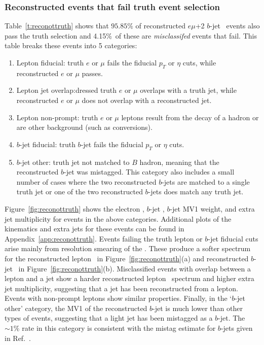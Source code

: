 \subsubsection{Reconstructed events that fail truth event selection}
Table~\ref{t:reconottruth} shows that $95.85\%$ of reconstructed $e\mu$+2 $b$-jet \ttbar\ events also pass the truth selection
and 4.15\%\ of these are \textit{misclassifed} events that fail. 
This table breaks these events into 5 categories:
\begin{enumerate}
\item{Lepton fiducial:} truth $e$ or $\mu$ fails the fiducial $p_{T}$ or $\eta$ cuts, while 
reconstructed $e$ or $\mu$ passes.
\item{Lepton jet overlap:}dressed truth $e$ or $\mu$  overlaps with a truth jet, while reconstructed $e$ or $\mu$ does not overlap with a reconstructed jet.
\item{Lepton non-prompt:} truth $e$ or $\mu$ leptons result from the decay of a hadron or are other background (such as
conversions).
\item{$b$-jet fiducial:} truth $b$-jet fails the fiducial $p_{T}$ or $\eta$ cuts.
\item{$b$-jet other:} truth jet not matched to $B$ hadron, meaning that the reconstructed $b$-jet was mistagged. 
This category also includes a small number of cases where the two reconstructed $b$-jets are matched to a single truth jet or 
one of the two reconstructed $b$-jets does match any truth jet.
\end{enumerate}
Figure~\ref{fig:reconottruth} shows the electron \pt, $b$-jet \pt, $b$-jet MV1 weight, and extra jet multiplicity 
for events in the above categories. Additional plots of the kinematics and extra jets for these events can be found in Appendix~\ref{app:reconottruth}. 
Events failing the truth lepton or $b$-jet fiducial cuts arise mainly from resolution smearing of the \pt.
These produce a softer spectrum 
for the reconstructed lepton \pt\ in Figure~\ref{fig:reconottruth}(a) and reconstructed $b$-jet \pt\ in Figure~\ref{fig:reconottruth}(b). 
Misclassified events with overlap between a lepton and a jet show a harder reconstructed lepton \pt\ spectrum and higher extra jet multiplicity, suggesting that a jet has been reconstructed from a lepton. Events with non-prompt leptons show similar properties. 
Finally, in the `$b$-jet other' category, the MV1 of the reconstructed $b$-jet is much lower than other types of events, 
suggesting that a light jet has been mistagged as a $b$-jet. The $\sim 1\%$ rate in this category is consistent with 
the mistag estimate for $b$-jets given in Ref.~\cite{btagmiscal}.

